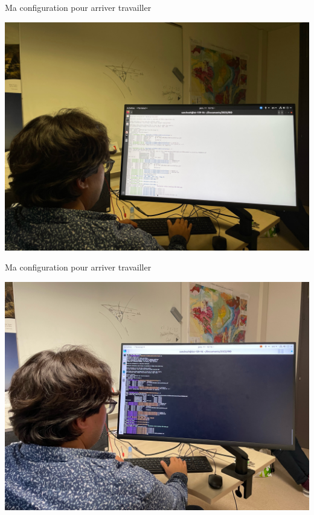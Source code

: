 \documentclass{beamer}
\begin{document}
\begin{frame}
 {Ma configuration pour arriver travailler}
 
  \includegraphics[width=1\linewidth]{images/photos/5/image0.jpeg}  
 
\end{frame}

\begin{frame}
 {Ma configuration pour arriver travailler}
 
  \includegraphics[width=1\linewidth]{images/photos/5/image5.jpeg}  
 
\end{frame}
\end{document}
